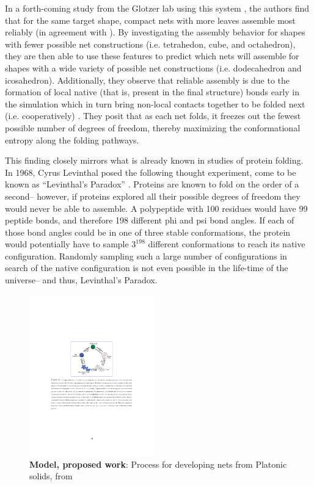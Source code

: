 In a forth-coming study from the Glotzer lab using this system \cite{Dodd_2018_unpublished}, the authors find that for the same target shape, compact nets with more leaves assemble most reliably (in agreement with \cite{Azam_2009_PlosOne}).
By investigating the assembly behavior for shapes with fewer possible net constructions (i.e. tetrahedon, cube, and octahedron), they are then able to use these features to predict which nets will assemble for shapes with a wide variety of possible net constructions (i.e. dodecahedron and icosahedron). 
Additionally, they observe that reliable assembly is due to the formation of local native (that is, present in the final structure) bonds early in the simulation which in turn bring non-local contacts together to be folded next (i.e. cooperatively) \cite{Dill_1993_PNAS}.
They posit that as each net folds, it freezes out the fewest possible number of degrees of freedom, thereby maximizing the conformational entropy along the folding pathways.

This finding closely mirrors what is already known in studies of protein folding.
In 1968, Cyrus Levinthal posed the following thought experiment, come to be known as ``Levinthal's Paradox'' \cite{Levinthal_1969}.
Proteins are known to fold on the order of a second-- however, if proteins explored all their possible degrees of freedom they would never be able to assemble.
A polypeptide with 100 residues would have 99 peptide bonds, and therefore 198 different phi and psi bond angles.
If each of those bond angles could be in one of three stable conformations, the protein would potentially have to sample $3^{198}$ different conformations to reach its native configuration.
Randomly sampling such a large number of configurations in search of the native configuration is not even possible in the life-time of the universe-- and thus, Levinthal's Paradox.

\begin{figure}
  \begin{center}
    \includegraphics[width=0.48\textwidth]{../figures/nets.pdf}
  \end{center}
  \caption{
  \textbf{Model, proposed work}:
  Process for developing nets from Platonic solids, from \cite{Dodd_2018_unpublished}}
\end{figure}

